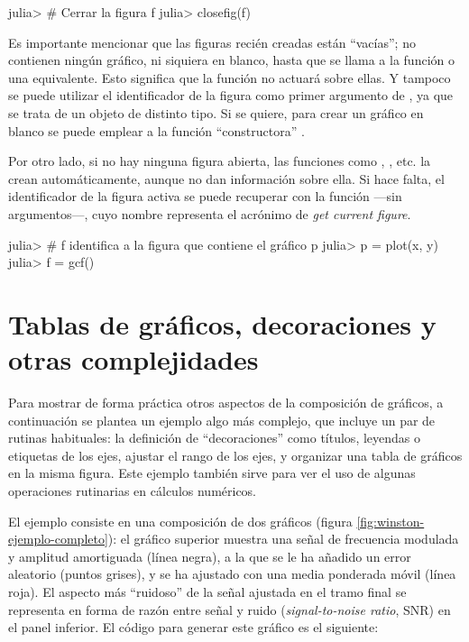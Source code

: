 \begin{jlconcode}
julia> # Cerrar la figura f
julia> closefig(f)
\end{jlconcode}

Es importante mencionar que las figuras recién creadas están ``vacías''; no contienen ningún gráfico, ni siquiera en blanco, hasta que se llama a la función  o una equivalente. Esto significa que la función  no actuará sobre ellas. Y tampoco se puede utilizar el identificador de la figura como primer argumento de , ya que se trata de un objeto de distinto tipo. Si se quiere, para crear un gráfico en blanco se puede emplear a la función ``constructora'' .

Por otro lado, si no hay ninguna figura abierta, las funciones como , , etc. la crean automáticamente, aunque no dan información sobre ella. Si hace falta, el identificador de la figura activa se puede recuperar con la función  ---sin argumentos---, cuyo nombre representa el acrónimo de \emph{get current figure}.

\begin{jlconcode}
julia> # f identifica a la figura que contiene el gráfico p
julia> p = plot(x, y)
julia> f = gcf()
\end{jlconcode}


\section{Tablas de gráficos, decoraciones y otras complejidades}

Para mostrar de forma práctica otros aspectos de la composición de gráficos, a continuación se plantea un ejemplo algo más complejo, que incluye un par de rutinas habituales: la definición de ``decoraciones'' como títulos, leyendas o etiquetas de los ejes, ajustar el rango de los ejes, y organizar una tabla de gráficos en la misma figura. Este ejemplo también sirve para ver el uso de algunas operaciones rutinarias en cálculos numéricos.

El ejemplo consiste en una composición de dos gráficos (figura \ref{fig:winston-ejemplo-completo}): el gráfico superior muestra una señal de frecuencia modulada y amplitud amortiguada (línea negra), a la que se le ha añadido un error aleatorio (puntos grises), y se ha ajustado con una media ponderada móvil (línea roja). El aspecto más ``ruidoso'' de la señal ajustada en el tramo final se representa en forma de razón entre señal y ruido (\emph{signal-to-noise ratio}, SNR) en el panel inferior. El código para generar este gráfico es el siguiente:

